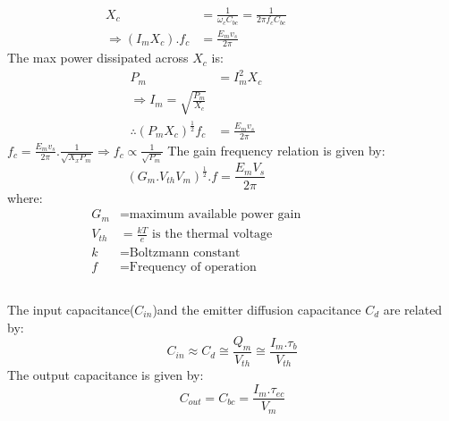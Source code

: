 \begin{frame}
  \begin{columns}
    \begin{align*}
      X_c &= \frac{1}{\omega_{c}C_{bc}} = \frac{1}{2\pi f_{c}C_{bc}}\\
      \Rightarrow (I_mX_c).f_c &= \frac{E_mv_s}{2\pi}
    \end{align*}
    The max power dissipated across $X_c$ is:
    \begin{align*}
      P_m &= I_m^2X_c\\
      \Rightarrow I_m = \sqrt{\frac{P_m}{X_c}}\\
      \therefore (P_mX_c)^{\frac{1}{2}}f_c &= \frac{E_mv_s}{2\pi}
    \end{align*}
    $f_c = \frac{E_mv_s}{2\pi}.\frac{1}{\sqrt{X_xP_m}}  \Rightarrow f_c \propto \frac{1}{\sqrt{P_m}} $
    The gain frequency relation is given by:
    $$(G_m.V_{th}V_{m})^{\frac{1}{2}}.f = \frac{E_mV_s}{2\pi}$$
    where:
    \begin{align*}
      G_m &= \text{maximum available power gain}\\
      V_{th} &= \frac{kT}{e} \text{ is the thermal voltage}\\
      k &= \text{Boltzmann constant}\\
      f &= \text{Frequency of operation}
    \end{align*}
  \end{columns}
\end{frame}

\begin{frame}
  The input capacitance($C_{in}$)and the emitter diffusion capacitance $C_d$ are related by:
  $$C_{in} \approx C_d \cong \frac{Q_{m}}{V_{th}} \cong \frac{I_m.\tau_b}{V_{th}}$$
  The output capacitance is given by:
  $$C_{out} = C_{bc} = \frac{I_m.\tau_{ec}}{V_m}$$
\end{frame}